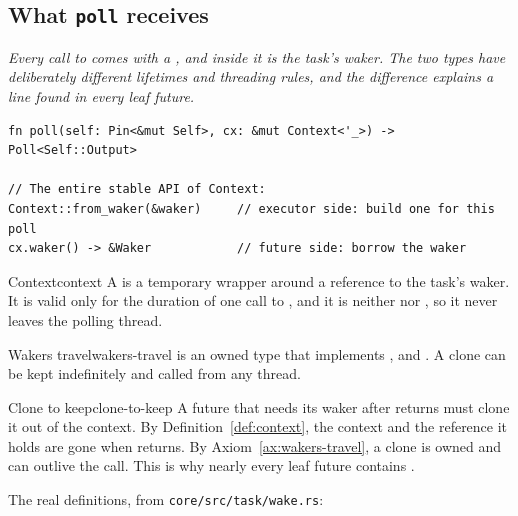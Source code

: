 \subsection{What \texorpdfstring{\texttt{poll}}{poll} receives}
\label{sec:wakers-ch4}

\textit{Every call to  comes with a , and inside it is the task's waker. The two types have deliberately different lifetimes and threading rules, and the difference explains a line found in every leaf future.}

\begin{lstlisting}[caption={The signature of \texttt{Future::poll} and the stable \texttt{Context} API.}, label=lst:wakers-4.1]
fn poll(self: Pin<&mut Self>, cx: &mut Context<'_>) -> Poll<Self::Output>

// The entire stable API of Context:
Context::from_waker(&waker)     // executor side: build one for this poll
cx.waker() -> &Waker            // future side: borrow the waker
\end{lstlisting}

\begin{definition}{Context}{context}
    A  is a temporary wrapper around a reference to the task's waker. It is valid only for the duration of one call to , and it is neither  nor , so it never leaves the polling thread.
\end{definition}

\begin{axiom}{Wakers travel}{wakers-travel}
     is an owned type that implements ,  and . A clone can be kept indefinitely and called from any thread.
\end{axiom}

\begin{lemma}{Clone to keep}{clone-to-keep}
    A future that needs its waker after  returns must clone it out of the context.
    \why By Definition~\ref{def:context}, the context and the reference it holds are gone when  returns. By Axiom~\ref{ax:wakers-travel}, a clone is owned and can outlive the call. This is why nearly every leaf future contains .
\end{lemma}

The real definitions, from \texttt{core/src/task/wake.rs}:

